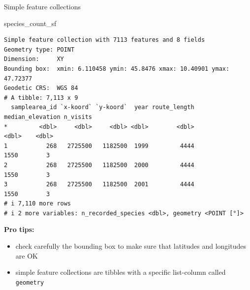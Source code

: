 \documentclass[
  ignorenonframetext,
  aspectratio=169,
]{beamer}
\newenvironment{Shaded}{\begin{snugshade}}{\end{snugshade}}
\newcommand{\NormalTok}[1]{\textcolor[rgb]{0.00,0.23,0.31}{#1}}
\providecommand{\tightlist}{%
  \setlength{\itemsep}{0pt}\setlength{\parskip}{0pt}}
\let\oldtexttt\texttt
\renewcommand{\texttt}[1]{\colorbox{gray!20}{\oldtexttt{#1}}}
\begin{document}
\begin{frame}[fragile]{Simple feature collections}
\protect{}\label{simple-feature-collections}
\scriptsize

\begin{Shaded}
\begin{Highlighting}[]
\NormalTok{species\_count\_sf}
\end{Highlighting}
\end{Shaded}

\begin{verbatim}
Simple feature collection with 7113 features and 8 fields
Geometry type: POINT
Dimension:     XY
Bounding box:  xmin: 6.110458 ymin: 45.8476 xmax: 10.40901 ymax: 47.72377
Geodetic CRS:  WGS 84
# A tibble: 7,113 x 9
  samplearea_id `x-koord` `y-koord`  year route_length median_elevation n_visits
*         <dbl>     <dbl>     <dbl> <dbl>        <dbl>            <dbl>    <dbl>
1           268   2725500   1182500  1999         4444             1550        3
2           268   2725500   1182500  2000         4444             1550        3
3           268   2725500   1182500  2001         4444             1550        3
# i 7,110 more rows
# i 2 more variables: n_recorded_species <dbl>, geometry <POINT [°]>
\end{verbatim}

\normalsize

\textbf{Pro tips:}

\begin{itemize}
\tightlist
\item
  check carefully the bounding box to make sure that latitudes and
  longitudes are OK
\item
  simple feature collections are tibbles with a specific list-column
  called \texttt{geometry}
\end{itemize}
\end{frame}
\end{document}
